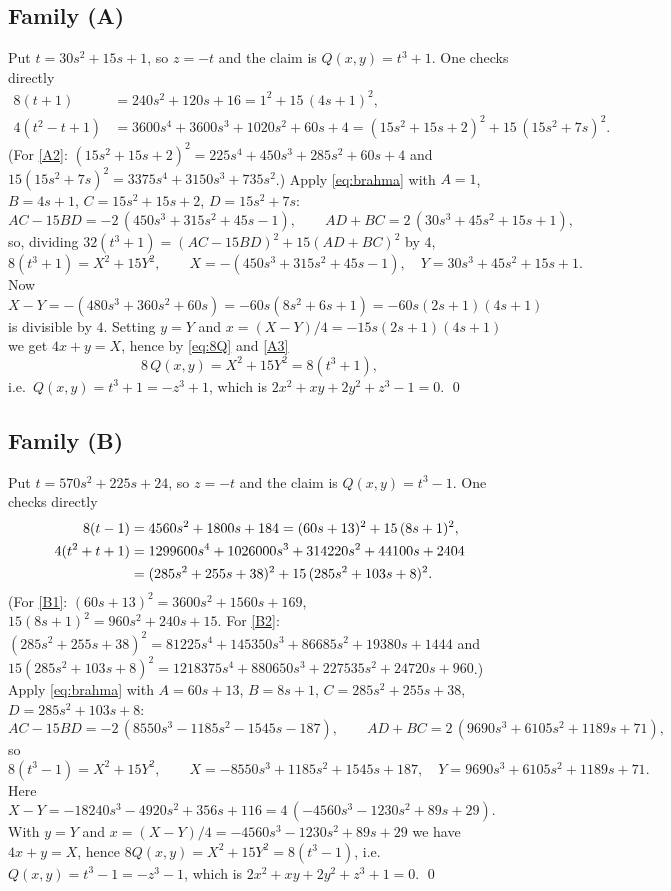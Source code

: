 \documentclass[11pt]{article}
\theoremstyle{remark}
\begin{document}
\subsection*{Family (A)}
Put $t=30s^{2}+15s+1$, so $z=-t$ and the claim is $Q(x,y)=t^{3}+1$. One checks directly
\begin{align}
8(t+1)&=240s^{2}+120s+16=1^{2}+15\,(4s+1)^{2},\label{A1}\\
4(t^{2}-t+1)&=3600s^{4}+3600s^{3}+1020s^{2}+60s+4
 =(15s^{2}+15s+2)^{2}+15\,(15s^{2}+7s)^{2}.\label{A2}
\end{align}
(For \eqref{A2}: $(15s^{2}+15s+2)^{2}=225s^{4}+450s^{3}+285s^{2}+60s+4$ and
$15(15s^{2}+7s)^{2}=3375s^{4}+3150s^{3}+735s^{2}$.)
Apply \eqref{eq:brahma} with $A=1$, $B=4s+1$, $C=15s^{2}+15s+2$, $D=15s^{2}+7s$:
\[
AC-15BD=-2\,(450s^{3}+315s^{2}+45s-1),\qquad AD+BC=2\,(30s^{3}+45s^{2}+15s+1),
\]
so, dividing $32(t^{3}+1)=(AC-15BD)^{2}+15(AD+BC)^{2}$ by $4$,
\begin{equation}\label{A3}
8(t^{3}+1)=X^{2}+15Y^{2},\qquad X=-(450s^{3}+315s^{2}+45s-1),\quad Y=30s^{3}+45s^{2}+15s+1.
\end{equation}
Now $X-Y=-(480s^{3}+360s^{2}+60s)=-60s(8s^{2}+6s+1)=-60s(2s+1)(4s+1)$ is divisible by $4$.
Setting $y=Y$ and $x=(X-Y)/4=-15s(2s+1)(4s+1)$ we get $4x+y=X$, hence by \eqref{eq:8Q} and \eqref{A3}
\[
8\,Q(x,y)=X^{2}+15Y^{2}=8(t^{3}+1),
\]
i.e.\ $Q(x,y)=t^{3}+1=-z^{3}+1$, which is $2x^{2}+xy+2y^{2}+z^{3}-1=0$. \qed

\subsection*{Family (B)}
Put $t=570s^{2}+225s+24$, so $z=-t$ and the claim is $Q(x,y)=t^{3}-1$. One checks directly
\begin{align}
8(t-1)&=4560s^{2}+1800s+184=(60s+13)^{2}+15\,(8s+1)^{2},\label{B1}\\
4(t^{2}+t+1)&=1299600s^{4}+1026000s^{3}+314220s^{2}+44100s+2404 \notag\\
 &=(285s^{2}+255s+38)^{2}+15\,(285s^{2}+103s+8)^{2}.\label{B2}
\end{align}
(For \eqref{B1}: $(60s+13)^{2}=3600s^{2}+1560s+169$, $15(8s+1)^{2}=960s^{2}+240s+15$.
For \eqref{B2}: $(285s^{2}+255s+38)^{2}=81225s^{4}+145350s^{3}+86685s^{2}+19380s+1444$ and
$15(285s^{2}+103s+8)^{2}=1218375s^{4}+880650s^{3}+227535s^{2}+24720s+960$.)
Apply \eqref{eq:brahma} with $A=60s+13$, $B=8s+1$, $C=285s^{2}+255s+38$, $D=285s^{2}+103s+8$:
\[
AC-15BD=-2\,(8550s^{3}-1185s^{2}-1545s-187),\qquad AD+BC=2\,(9690s^{3}+6105s^{2}+1189s+71),
\]
so
\begin{equation}\label{B3}
8(t^{3}-1)=X^{2}+15Y^{2},\qquad X=-8550s^{3}+1185s^{2}+1545s+187,\quad Y=9690s^{3}+6105s^{2}+1189s+71.
\end{equation}
Here $X-Y=-18240s^{3}-4920s^{2}+356s+116=4\,(-4560s^{3}-1230s^{2}+89s+29)$.
With $y=Y$ and $x=(X-Y)/4=-4560s^{3}-1230s^{2}+89s+29$ we have $4x+y=X$, hence
$8Q(x,y)=X^{2}+15Y^{2}=8(t^{3}-1)$, i.e.\ $Q(x,y)=t^{3}-1=-z^{3}-1$, which is
$2x^{2}+xy+2y^{2}+z^{3}+1=0$. \qed
\end{document}
